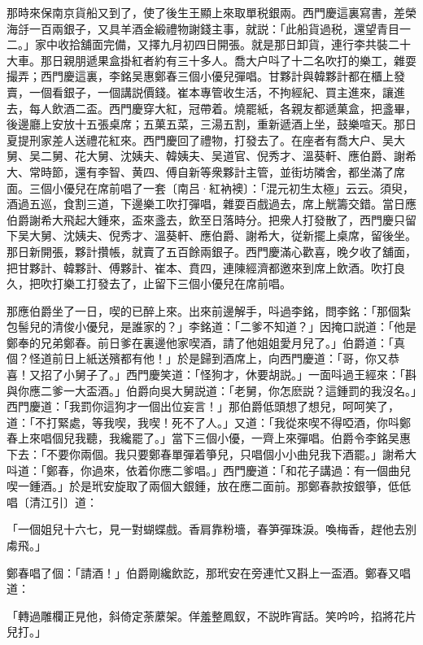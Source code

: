 那時來保南京貨船又到了，使了後生王顯上來取單税銀兩。西門慶這裏寫書，差榮海㧱一百兩銀子，又具羊酒金緞禮物謝錢主事，就説：「此船貨過税，還望青目一二。」家中收拾舖面完備，又擇九月初四日開張。就是那日卸貨，連行李共裝二十大車。那日親朋遞果盒掛紅者約有三十多人。喬大户呌了十二名吹打的樂工，雜耍撮弄；西門慶這裏，李銘吴惠鄭春三個小優兒彈唱。甘夥計與韓夥計都在櫃上發賣，一個看銀子，一個講説價錢。崔本專管收生活，不拘經紀、買主進來，讓進去，每人飲酒二盃。西門慶穿大紅，冠帶着。燒罷紙，各親友都遞菓盒，把盞畢，後邊廳上安放十五張桌席；五菓五菜，三湯五割，重新遞酒上坐，鼓樂喧天。那日夏提刑家差人送禮花紅來。西門慶回了禮物，打發去了。在座者有喬大户、吴大舅、吴二舅、花大舅、沈姨夫、韓姨夫、吴道官、倪秀才、溫葵軒、應伯爵、謝希大、常時節，還有李智、黄四、傅自新等衆夥計主管，並街坊隣舍，都坐滿了席面。三個小優兒在席前唱了一套〔南吕·紅衲襖〕：「混元初生太極」云云。須臾，酒過五巡，食割三道，下邊樂工吹打彈唱，雜耍百戲過去，席上觥籌交錯。當日應伯爵謝希大飛起大鍾來，盃來盞去，飲至日落時分。把衆人打發散了，西門慶只留下吴大舅、沈姨夫、倪秀才、溫葵軒、應伯爵、謝希大，従新擺上桌席，留後坐。那日新開張，夥計攢帳，就賣了五百餘兩銀子。西門慶滿心歡喜，晚夕收了舖面，把甘夥計、韓夥計、傅夥計、崔本、賁四，連陳經濟都邀來到席上飲酒。吹打良久，把吹打樂工打發去了，止留下三個小優兒在席前唱。

那應伯爵坐了一日，喫的已醉上來。出來前邊解手，呌過李銘，問李銘：「那個紮包髻兒的清俊小優兒，是誰家的？」李銘道：「二爹不知道？」因掩口説道：「他是鄭奉的兄弟鄭春。前日爹在裏邊他家喫酒，請了他姐姐愛月兒了。」伯爵道：「真個？怪道前日上紙送殯都有他！」於是歸到酒席上，向西門慶道：「哥，你又恭喜！又招了小舅子了。」西門慶笑道：「怪狗才，休要胡説。」一面呌過王經來：「斟與你應二爹一大盃酒。」伯爵向吳大舅説道：「老舅，你怎麽説？這鍾罰的我沒名。」西門慶道：「我罰你這狗才一個出位妄言！」那伯爵低頭想了想兒，呵呵笑了，道：「不打緊處，等我喫，我喫！死不了人。」又道：「我從來喫不得啞酒，你呌鄭春上來唱個兒我聽，我纔罷了。」當下三個小優，一齊上來彈唱。伯爵令李銘吴惠下去：「不要你兩個。我只要鄭春單彈着箏兒，只唱個小小曲兒我下酒罷。」謝希大呌道：「鄭春，你過來，依着你應二爹唱。」西門慶道：「和花子講過：有一個曲兒喫一鍾酒。」於是玳安旋取了兩個大銀鍾，放在應二面前。那鄭春款按銀箏，低低唱〔清江引〕道：

\begin{myquote}
「一個姐兒十六七，見一對蝴蝶戲。香肩靠粉墻，春笋彈珠淚。喚梅香，趕他去別䖏飛。」
\end{myquote}

鄭春唱了個：「請酒！」伯爵剛纔飲訖，那玳安在旁連忙又斟上一盃酒。鄭春又唱道：

\begin{myquote}
「轉過雕欄正見他，斜倚定荼䕷架。佯羞整鳳釵，不説昨宵話。笑吟吟，掐將花片兒打。」
\end{myquote}

